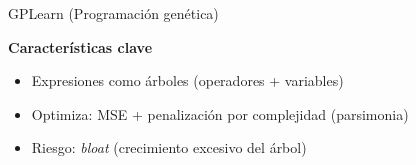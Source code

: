 \documentclass[10pt, aspectratio=169]{beamer}
\begin{document}
\begin{frame}{GPLearn (Programación genética)}
\begin{center}
\begin{tikzpicture}
\end{tikzpicture}
\end{center}

\vspace{0.2cm}

\textbf{Características clave}
\begin{itemize}
    \item Expresiones como árboles (operadores + variables)
    \item Optimiza: MSE + penalización por complejidad (parsimonia)
    \item Riesgo: \textit{bloat} (crecimiento excesivo del árbol)
\end{itemize}

\end{frame}
\end{document}
